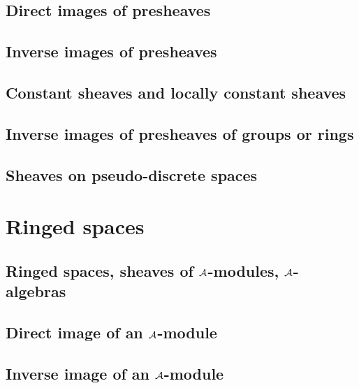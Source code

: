         \subsection{Direct images of presheaves}
        

        \subsection{Inverse images of presheaves}
        

        \subsection{Constant sheaves and locally constant sheaves}
        

        \subsection{Inverse images of presheaves of groups or rings}
        

        \subsection{Sheaves on pseudo-discrete spaces}
        

    \section{Ringed spaces}

        \subsection{Ringed spaces, sheaves of $\mathcal{A}$-modules, $\mathcal{A}$-algebras}
        

        \subsection{Direct image of an $\mathcal{A}$-module}
        

        \subsection{Inverse image of an $\mathcal{A}$-module}
        


